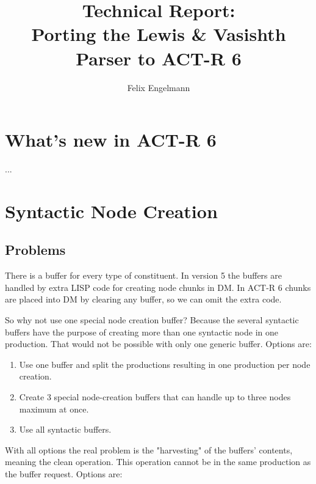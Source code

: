 \documentclass[nobf,fignum,doc,longtable]{apa}
\title{Technical Report: \\ Porting the Lewis \& Vasishth Parser to ACT-R 6}
\author{Felix Engelmann}
\affiliation{University of Potsdam}
\begin{document}
\maketitle                            


\section{What's new in ACT-R 6}
...

\section{Syntactic Node Creation}
\subsection{Problems}
There is a buffer for every type of constituent. In version 5 the buffers are handled by extra LISP code for creating node chunks in DM. In ACT-R 6 chunks  are placed into DM by clearing any buffer, so we can omit the extra code.

So why not use one special node creation buffer? Because the several syntactic buffers have the purpose of creating more than one syntactic node in one production. That would not be possible with only one generic buffer. Options are: \\

\begin{enumerate}
\item Use one buffer and split the productions resulting in one production per node creation.
\item Create 3 special node-creation buffers that can handle up to three nodes maximum at once.
\item Use all syntactic buffers.
\end{enumerate}


With all options the real problem is the "harvesting" of the buffers' contents, meaning the clean operation. This operation cannot be in the same production as the buffer request. Options are: \\
\end{document}
